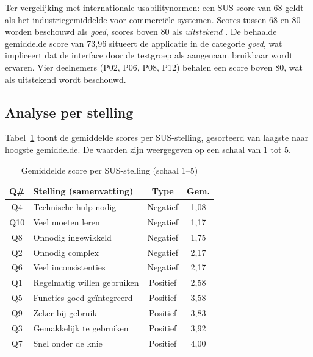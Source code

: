 Ter vergelijking met internationale usabilitynormen: een SUS-score van 68 geldt als het industriegemiddelde voor commerciële systemen.
Scores tussen 68 en 80 worden beschouwd als \textit{goed}, scores boven 80 als \textit{uitstekend} \autocite{Brooke1995}.
De behaalde gemiddelde score van 73,96 situeert de applicatie in de categorie \textit{goed}, wat impliceert dat de interface door de testgroep als aangenaam bruikbaar wordt ervaren.
Vier deelnemers (P02, P06, P08, P12) behalen een score boven 80, wat als uitstekend wordt beschouwd.

\subsection{Analyse per stelling}
\label{subsec:analyseperstelling}
 
Tabel~\ref{tab:sus-per-stelling} toont de gemiddelde scores per SUS-stelling, gesorteerd van laagste naar hoogste gemiddelde.
De waarden zijn weergegeven op een schaal van 1 tot 5.
 
\begin{table}[H]
    \centering
    \caption{Gemiddelde score per SUS-stelling (schaal 1--5)}
    \label{tab:sus-per-stelling}
    \begin{tabular}{clcc}
        \toprule
        \textbf{Q\#} & \textbf{Stelling (samenvatting)} & \textbf{Type} & \textbf{Gem.} \\
        \midrule
        Q4  & Technische hulp nodig          & Negatief & 1,08 \\
        Q10 & Veel moeten leren              & Negatief & 1,17 \\
        Q8  & Onnodig ingewikkeld            & Negatief & 1,75 \\
        Q2  & Onnodig complex                & Negatief & 2,17 \\
        Q6  & Veel inconsistenties           & Negatief & 2,17 \\
        Q1  & Regelmatig willen gebruiken    & Positief & 2,58 \\
        Q5  & Functies goed geïntegreerd     & Positief & 3,58 \\
        Q9  & Zeker bij gebruik              & Positief & 3,83 \\
        Q3  & Gemakkelijk te gebruiken       & Positief & 3,92 \\
        Q7  & Snel onder de knie             & Positief & 4,00 \\
        \bottomrule
    \end{tabular}
\end{table}
 
